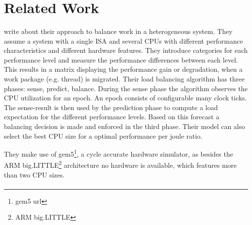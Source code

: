 \section{Related Work}
\label{state:related}

\begin{comment}
  Structure for the description of related work:
    * Assumptions
    * Concept
    * Relevant contribution
    * Result
    * Deficits
\end{comment}

\paragraph{ \cite{sarma_smartbalance_2015} } \citeauthor{sarma_smartbalance_2015}
write about their approach to balance work in a heterogeneous system.
They assume a system with a single ISA and several CPUs with different performance
characteristics and different hardware features.
They introduce categories for each performance level and measure the
performance differences between each level.
This results in a matrix displaying the performance gain or degradation, when
a work package (e.g. thread) is migrated.
Their load balancing algorithm has three phases: sense, predict, balance.
During the sense phase the algorithm observes the CPU utilization for an epoch.
An epoch consists of configurable many clock ticks.
The sense-result is then used by the prediction phase to compute a load
expectation for the different performance levels.
Based on this forecast a balancing decision is made and enforced in the third
phase.
Their model can also select the best CPU size for a optimal performance per
joule ratio.


They make use of gem5\footnote{gem5 url}, a cycle accurate hardware simulator,
as besides the ARM big.LITTLE\footnote{ARM big.LITTLE} architecture no
hardware is available, which features more than two CPU sizes.


\paragraph{ \cite{hofmeyr_load_2010} }

\paragraph{ \cite{cruz_dynamic_2014} }

